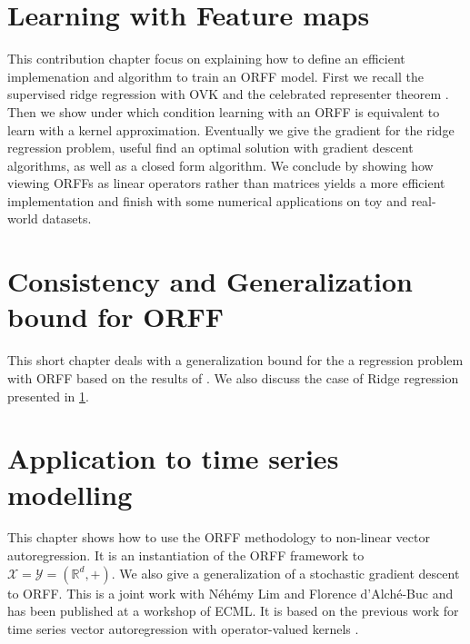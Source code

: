 \chapter{Learning with Feature maps}
\label{ch:learning operator-valued_random_fourier_features}
\bigskip
\begin{justify}
    This contribution chapter focus on explaining how to define an efficient
    implemenation and algorithm to train an \acs{ORFF} model. First we recall
    the supervised ridge regression with \acs{OVK} and the celebrated
    representer theorem \citep{Wahba90}. Then we show under which condition
    learning with an \acs{ORFF} is equivalent to learn with a kernel
    approximation. Eventually we give the gradient for the ridge regression
    problem, useful find an optimal solution with gradient descent algorithms,
    as well as a closed form algorithm.  We conclude by showing how viewing
    \acsp{ORFF} as linear operators rather than matrices yields a more
    efficient implementation and finish with some numerical applications on toy
    and real-world datasets.
\end{justify}
\minitoc


\chapter{Consistency and Generalization bound for ORFF}
\label{ch:generalization_for_ORFF}
\bigskip
\begin{justify} 
    This short chapter deals with a generalization bound for the a regression
    problem with ORFF based on the results of \citet{rahimi2009weighted,
    maurer2016vector}. We also discuss the case of Ridge regression presented
    in \cref{ch:learning operator-valued_random_fourier_features}.
\end{justify}
\minitoc



\chapter{Application to time series modelling} %
\label{ch:applications}
\bigskip
\begin{justify}
    This chapter shows how to use the \acs{ORFF} methodology to non-linear
    vector autoregression. It is an instantiation of the \acs{ORFF} framework
    to $\mathcal{X}=\mathcal{Y}=(\mathbb{R}^d, +)$. We also give a
    generalization of a stochastic gradient descent \citep{dai2014scalable} to
    \acs{ORFF}. This is a joint work with N\'eh\'emy Lim and Florence
    d'Alch\'e-Buc and has been published at a workshop of \acs{ECML}. It is
    based on the previous work \citet{Lim2015} for time series vector
    autoregression with operator-valued kernels \cite{brault2016scaling}.
\end{justify}
\minitoc

